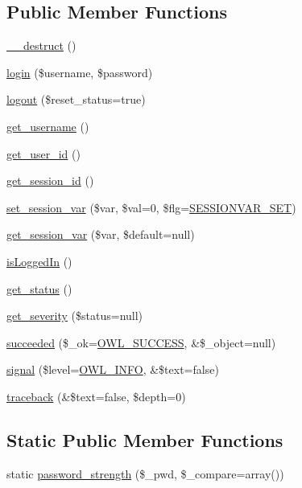 \subsection*{Public Member Functions}
\begin{DoxyCompactItemize}
\item 
\hyperlink{classUser_accd20149a7414612c1505e022eb63ffc}{\_\-\_\-destruct} ()
\item 
\hyperlink{classUser_a2c4fae5935ebf84e787126795bf42988}{login} (\$username, \$password)
\item 
\hyperlink{classUser_a95e19a7d141f922c2870a6404ff641b1}{logout} (\$reset\_\-status=true)
\item 
\hyperlink{classUser_a1348ddf190d4df2518665fb51305a902}{get\_\-username} ()
\item 
\hyperlink{classUser_a17c0e323e79f0de0b19574549e6c7906}{get\_\-user\_\-id} ()
\item 
\hyperlink{classUser_ac5f09e73bdf4f3a626cd7b06c844704f}{get\_\-session\_\-id} ()
\item 
\hyperlink{classUser_a80108765c46ddec1ab776a774ae07f53}{set\_\-session\_\-var} (\$var, \$val=0, \$flg=\hyperlink{class_8sessionhandler_8php_af9e860b1663497a46177b0ec35d6a9f5}{SESSIONVAR\_\-SET})
\item 
\hyperlink{classUser_a84f3693077e777cc1d61b45fcecdb36c}{get\_\-session\_\-var} (\$var, \$default=null)
\item 
\hyperlink{classUserHandler_a4539c12ed2ce12a9147d61496854d5ab}{isLoggedIn} ()
\item 
\hyperlink{class__OWL_a99ec771fa2c5c279f80152cc09e489a8}{get\_\-status} ()
\item 
\hyperlink{class__OWL_adf9509ef96858be7bdd9414c5ef129aa}{get\_\-severity} (\$status=null)
\item 
\hyperlink{class__OWL_a53ab4d3bbb2c6a56966c339ca4b4c805}{succeeded} (\$\_\-ok=\hyperlink{owl_8severitycodes_8php_a96223f06ba27bf5cbefa6e9d702897c2}{OWL\_\-SUCCESS}, \&\$\_\-object=null)
\item 
\hyperlink{class__OWL_a51ba4a16409acf2a2f61f286939091a5}{signal} (\$level=\hyperlink{owl_8severitycodes_8php_a139328861128689f2f4def6a399d9057}{OWL\_\-INFO}, \&\$text=false)
\item 
\hyperlink{class__OWL_aa29547995d6741b7d2b90c1d4ea99a13}{traceback} (\&\$text=false, \$depth=0)
\end{DoxyCompactItemize}
\subsection*{Static Public Member Functions}
\begin{DoxyCompactItemize}
\item 
static \hyperlink{classUser_a4d4ea8d545686fa335e8597f1bab73d2}{password\_\-strength} (\$\_\-pwd, \$\_\-compare=array())
\end{DoxyCompactItemize}
